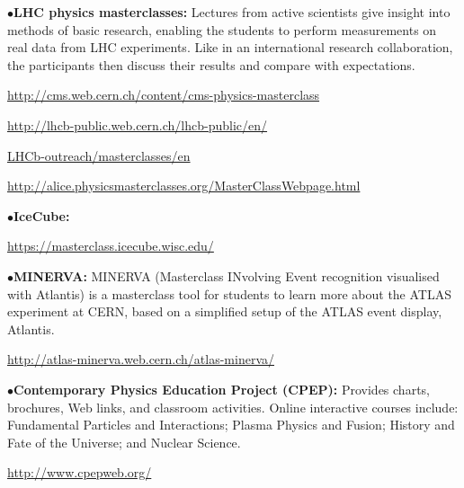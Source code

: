 \medskip

\item{$\bullet$}{\bf LHC physics masterclasses:}
Lectures from active scientists give insight into methods of basic research, enabling the students to perform measurements on real data from LHC experiments. Like in an international research collaboration, the participants then discuss their results and compare with expectations.
	\item{}\qquad\url{http://cms.web.cern.ch/content/cms-physics-masterclass}
	\item{}\qquad\url{http://lhcb-public.web.cern.ch/lhcb-public/en/} %
	\item{}\qquad\qquad\url{LHCb-outreach/masterclasses/en} %
	\item{}\qquad\url{http://alice.physicsmasterclasses.org/MasterClassWebpage.html}

\medskip

\item{$\bullet$}{\bf IceCube:}
	\item{}\qquad\url{https://masterclass.icecube.wisc.edu/}

\medskip

\item{$\bullet$}{\bf MINERVA:}
MINERVA (Masterclass INvolving Event recognition visualised with Atlantis) is a masterclass tool for students to learn more about the ATLAS experiment at CERN, based on a simplified setup of the ATLAS event display, Atlantis.
	\item{}\qquad\url{http://atlas-minerva.web.cern.ch/atlas-minerva/}

\medskip
\medskip


\item{$\bullet$}{\bf Contemporary Physics Education Project (CPEP):}
Provides charts, brochures, Web links, and classroom activities. Online interactive courses include: Fundamental Particles and Interactions; Plasma Physics and Fusion; History and Fate of the Universe; and Nuclear Science.
	\item{}\qquad\url{http://www.cpepweb.org/}



